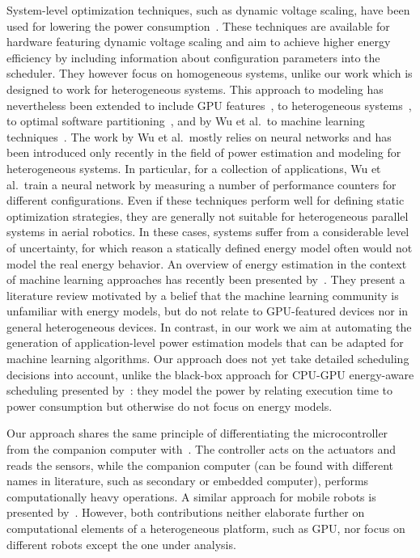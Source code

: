 System-level optimization techniques, such as dynamic voltage scaling, have been used for lowering the power consumption~\citep{hong1999power, luo2001battery, chowdhury2005static}. These techniques are available for hardware featuring dynamic voltage scaling and aim to achieve higher energy efficiency by including information about configuration parameters into the scheduler. They however focus on homogeneous systems, unlike our work which is designed to work for heterogeneous systems. This approach to modeling has nevertheless been extended to include GPU features~\citep{hong2010integrated}, to heterogeneous systems~\citep{bailey2014adaptive}, to optimal software partitioning~\citep{goraczko2008energy}, and by Wu et al.\ to machine learning techniques~\citep{wu2015gpgpu}. The work by Wu et al.\ mostly relies on neural networks and has been introduced only recently in the field of power estimation and modeling for heterogeneous systems. In particular, for a collection of applications, Wu et al.\ train a neural network by measuring a number of performance counters for different configurations. Even if these techniques perform well for defining static optimization strategies, they are generally not suitable for heterogeneous parallel systems in aerial robotics. In these cases, systems suffer from a considerable level of uncertainty, for which reason a statically defined energy model often would not model the real energy behavior. An overview of energy estimation in the context of machine learning approaches has recently been presented by~\citep{garcia2019estimation}. They present a literature review motivated by a belief that the machine learning community is unfamiliar with energy models, but do not relate to GPU-featured devices nor in general heterogeneous devices. In contrast, in our work we aim at automating the generation of application-level power estimation models that can be adapted for machine learning algorithms. Our approach does not yet take detailed scheduling decisions into account, unlike the black-box approach for CPU-GPU energy-aware scheduling presented by~\citep{barik2016black}: they model the power by relating execution time to power consumption but otherwise do not focus on energy models.

Our approach shares the same principle of differentiating the microcontroller from the companion computer with~\citep{mei2004energy, mei2005case}. The controller acts on the actuators and reads the sensors, while the companion computer (can be found with different names in literature, such as secondary or embedded computer), performs computationally heavy operations. A similar approach for mobile robots is presented by~\citep{dressler2005energy}. However, both contributions neither elaborate further on computational elements of a heterogeneous platform, such as GPU, nor focus on different robots except the one under analysis.

